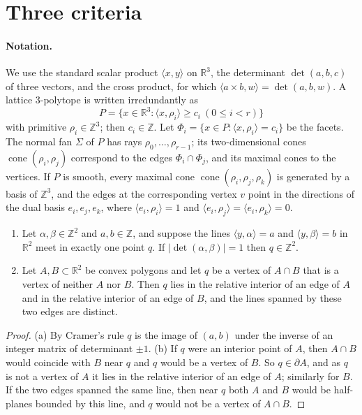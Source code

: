 \documentclass[12pt]{article}
\newcommand{\R}{\mathbb{R}}
\newcommand{\Z}{\mathbb{Z}}
\newcommand{\cone}{\operatorname{cone}}
\newcommand{\inn}[2]{\langle #1,#2\rangle}
\begin{document}
\section{Three criteria}\label{sec:criteria}

\paragraph{Notation.} We use the standard scalar product $\inn{x}{y}$ on $\R^3$, the determinant $\det(a,b,c)$ of three vectors, and the cross product, for which $\inn{a\times b}{w}=\det(a,b,w)$. A lattice $3$-polytope is written irredundantly as
\[ P=\{x\in\R^3:\inn{x}{\rho_i}\ge c_i\ (0\le i<r)\} \]
with primitive $\rho_i\in\Z^3$; then $c_i\in\Z$. Let $\Phi_i=\{x\in P:\inn{x}{\rho_i}=c_i\}$ be the facets. The normal fan $\Sigma$ of $P$ has rays $\rho_0,\dots,\rho_{r-1}$; its two-dimensional cones $\cone(\rho_i,\rho_j)$ correspond to the edges $\Phi_i\cap\Phi_j$, and its maximal cones to the vertices. If $P$ is smooth, every maximal cone $\cone(\rho_i,\rho_j,\rho_k)$ is generated by a basis of $\Z^3$, and the edges at the corresponding vertex $v$ point in the directions of the dual basis $e_i,e_j,e_k$, where $\inn{e_i}{\rho_i}=1$ and $\inn{e_i}{\rho_j}=\inn{e_i}{\rho_k}=0$.

\begin{lemma}\label{lem:plane}
\begin{enumerate}
\item[(a)] Let $\alpha,\beta\in\Z^2$ and $a,b\in\Z$, and suppose the lines $\inn{y}{\alpha}=a$ and $\inn{y}{\beta}=b$ in $\R^2$ meet in exactly one point $q$. If $|\det(\alpha,\beta)|=1$ then $q\in\Z^2$.
\item[(b)] Let $A,B\subset\R^2$ be convex polygons and let $q$ be a vertex of $A\cap B$ that is a vertex of neither $A$ nor $B$. Then $q$ lies in the relative interior of an edge of $A$ and in the relative interior of an edge of $B$, and the lines spanned by these two edges are distinct.
\end{enumerate}
\end{lemma}

\begin{proof}
(a) By Cramer's rule $q$ is the image of $(a,b)$ under the inverse of an integer matrix of determinant $\pm1$.
(b) If $q$ were an interior point of $A$, then $A\cap B$ would coincide with $B$ near $q$ and $q$ would be a vertex of $B$. So $q\in\partial A$, and as $q$ is not a vertex of $A$ it lies in the relative interior of an edge of $A$; similarly for $B$. If the two edges spanned the same line, then near $q$ both $A$ and $B$ would be half-planes bounded by this line, and $q$ would not be a vertex of $A\cap B$.
\end{proof}
\end{document}
